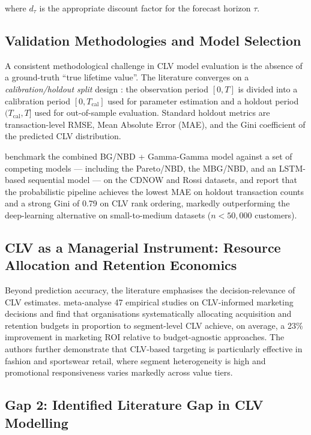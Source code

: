 where $d_\tau$ is the appropriate discount factor for the forecast horizon $\tau$.

\subsection{Validation Methodologies and Model Selection}

A consistent methodological challenge in CLV model evaluation is the absence of a ground-truth ``true lifetime value''. The literature converges on a \textit{calibration/holdout split} design \cite{palive_BGNBD}: the observation period $[0, T]$ is divided into a calibration period $[0, T_{\text{cal}}]$ used for parameter estimation and a holdout period $(T_{\text{cal}}, T]$ used for out-of-sample evaluation. Standard holdout metrics are transaction-level RMSE, Mean Absolute Error (MAE), and the Gini coefficient of the predicted CLV distribution.

\cite{GammaGamma2013} benchmark the combined BG/NBD + Gamma-Gamma model against a set of competing models — including the Pareto/NBD, the MBG/NBD, and an LSTM-based sequential model — on the CDNOW and Rossi datasets, and report that the probabilistic pipeline achieves the lowest MAE on holdout transaction counts and a strong Gini of 0.79 on CLV rank ordering, markedly outperforming the deep-learning alternative on small-to-medium datasets ($n < 50{,}000$ customers).

\subsection{CLV as a Managerial Instrument: Resource Allocation and Retention Economics}

Beyond prediction accuracy, the literature emphasises the decision-relevance of CLV estimates. \cite{CLVInsightsStrategic2024} meta-analyse 47 empirical studies on CLV-informed marketing decisions and find that organisations systematically allocating acquisition and retention budgets in proportion to segment-level CLV achieve, on average, a 23\% improvement in marketing ROI relative to budget-agnostic approaches. The authors further demonstrate that CLV-based targeting is particularly effective in fashion and sportswear retail, where segment heterogeneity is high and promotional responsiveness varies markedly across value tiers.

\subsection{Gap 2: Identified Literature Gap in CLV Modelling}

